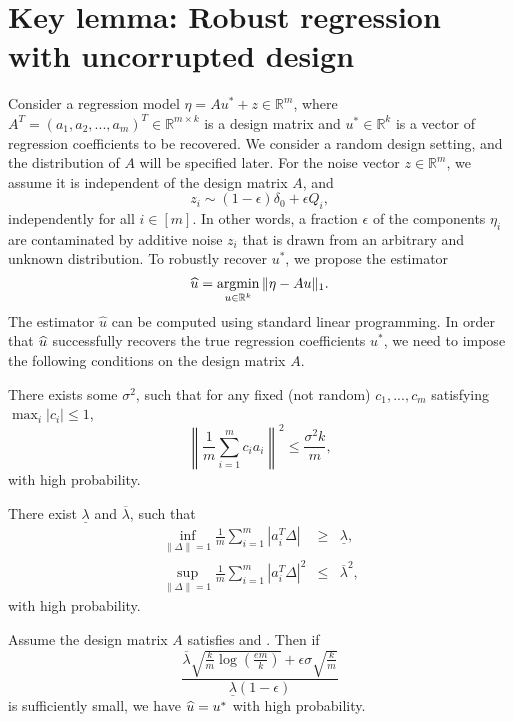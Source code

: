
\section{Key lemma: Robust regression with uncorrupted design}
\label{sec:regression}

Consider a regression model $\eta=Au^*+z\in\mathbb{R}^m$, where $A^T=(a_1,a_2,...,a_m)^T\in\mathbb{R}^{m\times k}$ is a design matrix and $u^*\in\mathbb{R}^k$ is a vector of regression coefficients to be recovered. We consider a random design setting, and the distribution of $A$ will be specified later. For the noise vector $z\in\mathbb{R}^m$, we assume it is independent of the design matrix $A$, and
\begin{equation}
z_i\sim (1-\epsilon)\delta_0 + \epsilon Q_i, \label{eq:noise-add-con}
\end{equation}
independently for all $i\in[m]$. In other words, a fraction $\epsilon$ of the components $\eta_i$ are contaminated by
additive noise $z_i$ that is drawn from an arbitrary and unknown distribution. To robustly recover $u^*$, we propose the estimator
$$\widehat{u}=\mathop{\rm argmin}_{u\in\mathbb{R}^k}\|\eta-Au\|_1.$$
The estimator $\hat u$ can be computed using standard linear programming.
In order that $\widehat{u}$ successfully recovers the true regression coefficients $u^*$, we need to impose the following conditions on the design matrix $A$.


\begin{con0}
There exists some $\sigma^2$, such that for any fixed (not random) $c_1,...,c_m$ satisfying $\max_i|c_i|\leq 1$,
\begin{equation}
  \left\|\frac{1}{m}\sum_{i=1}^mc_ia_i\right\|^2\leq \frac{\sigma^2k}{m},
\end{equation}
with high probability.
\end{con0}

\begin{con2}
There exist $\underline{\lambda}$ and $\overline{\lambda}$, such that
\begin{eqnarray}
\label{eq:l1-upper-A} \inf_{\|\Delta\|=1}\frac{1}{m}\sum_{i=1}^m|a_i^T\Delta| &\geq& \underline{\lambda}, \\
\label{eq:l2-upper-A} \sup_{\|\Delta\|=1}\frac{1}{m}\sum_{i=1}^m|a_i^T\Delta|^2 &\leq& \overline{\lambda}^2,
\end{eqnarray}
with high probability.
\end{con2}


\begin{thm}\label{thm:main-improved}
Assume the design matrix $A$ satisfies \conditionA{} and \conditionB. Then if
\begin{equation}
\frac{\overline{\lambda}\sqrt{\frac{k}{m}\log\left(\frac{em}{k}\right)}+\epsilon\sigma\sqrt{\frac{k}{m}}}{\underline{\lambda}(1-\epsilon)}
\end{equation}
is sufficiently small, we have $\widehat{u}=u^*$ with high probability.
\end{thm}

